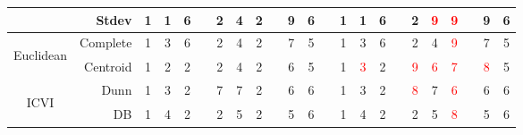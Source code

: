 \begin{landscape}
\begin{table}[!h]
\begin{tabular}{@{}crccccccccccccccccccccc@{}}
            &Stdev & 
            1   & 1   & 6 & \phantom{a}           
            & 2  & 4  & 2  & \phantom{a}       
            & 9  & 6        
            & \phantom{a} &
            1    & 1   & 6 & \phantom{a}           
            & 2  & \textcolor{red}{9}   & \textcolor{red}{9} & \phantom{a}        
            & 9   & 6                         \\
            \midrule
            
            \multirow{2}{*}{\begin{turn}{90}{\scriptsize Euclidean}\end{turn}}
            &Complete & 
            1  & 3  & 6   & \phantom{a}           
            & 2  & 4  & 2   & \phantom{a}        
            & 7  & 5                         
            & \phantom{a} &
            1    & 3   & 6 & \phantom{a}           
            & 2  & 4   & \textcolor{red}{9} & \phantom{a}        
            & 7   & 5                         \\
            
            &Centroid & 
            1  & 2  & 2  & \phantom{a}           
            & 2  & 4  & 2       & \phantom{a}       
            & 6  & 5        
            & \phantom{a} &
            1    & \textcolor{red}{3}   & 2 & \phantom{a}           
            & \textcolor{red}{9}  & \textcolor{red}{6}   & \textcolor{red}{7} & \phantom{a}        
            & \textcolor{red}{8}   & 5                         \\
            
            \midrule
            
            \multirow{4}{*}{\begin{turn}{90}{\scriptsize ICVI }\end{turn}}
            & Dunn & 
            1  & 3  & 2 & \phantom{a}           
            & 7  & 7  & 2 & \phantom{a}        
            & 6  & 6            
            & \phantom{a} &
            1    & 3   & 2 & \phantom{a}           
            & \textcolor{red}{8}  & 7   & \textcolor{red}{6} & \phantom{a}        
            & 6   & 6                         \\
            
            &DB & 
            1  & 4  & 2 & \phantom{a}           
            & 2  & 5  & 2 & \phantom{a}        
            & 5  & 6        
            & \phantom{a} &
            1    & 4   & 2 & \phantom{a}           
            & 2  & 5   & \textcolor{red}{8} & \phantom{a}        
            & 5   & 6                         \\
            

\end{tabular}
\end{table}
\end{landscape}
